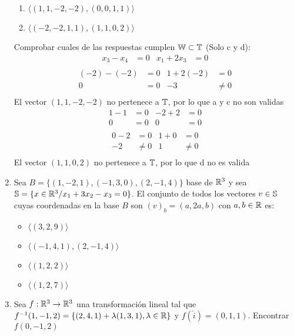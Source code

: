 \documentclass[../practica.root.tex]{subfiles}
\begin{document}
\begin{enumerate}
\begin{enumerate}
              \item \( \langle (1,1,−2,−2),(0,0,1,1) \rangle \) \xmark
              \item \( \langle (−2,−2,1,1),(1,1,0,2) \rangle \) \xmark
          \end{enumerate}
          Comprobar cuales de las respuestas cumplen \( \W \subset \T \) (Solo c y d):
          \begin{align*}
              x_3 − x_4 & = 0 & x_1 + 2x_3 & = 0 \\
          \end{align*}
          \begin{align*}
              (-2) − (-2) & = 0 & 1 + 2(-2) & = 0    \\
              0           & = 0 & -3        & \neq 0 \\
          \end{align*}
          El vector \( (1,1,-2,-2) \) no pertenece a \( \T \), por lo que a y c no son validas
          \begin{align*}
              1 - 1 & = 0 & -2 + 2 & = 0 \\
              0     & = 0 & 0      & = 0 \\
          \end{align*}
          \begin{align*}
              0 - 2 & = 0    & 1 + 0 & = 0    \\
              -2    & \neq 0 & 1     & \neq 0 \\
          \end{align*}
          El vector \( (1,1,0,2) \) no pertenece a \( \T \), por lo que d no es valida
    \item Sea \( B = \{(1,-2,1),(-1,3,0),(2,-1,4) \}\) base de \( \R^3 \) y sea \( \S = \{ x \in \R^3 / x_1 + 3x_2 - x_3 = 0 \} \). El conjunto de todos los vectores \( v \in \S \) cuyas coordenadas en la base \(B\) son \( (v)_b = (a,2a,b) \) con \( a,b \in \R \) es:
          \begin{itemize}
              \item \(\langle (3,2,9) \rangle\)
              \item \(\langle (-1,4,1),(2,-1,4) \rangle\)
              \item \(\langle (1,2,2) \rangle\)
              \item \(\langle (1,2,7) \rangle\)
          \end{itemize}
    \item Sea \( f : \R^3 \to \R^3 \) una transformación lineal tal que \( f^{-1}(1,-1,2) = \{ (2,4,1) + \lambda(1,3,1),\lambda \in \R \} \) y \( f(\hat{i}) = (0,1,1) \). Encontrar \( f(0,-1,2) \) \\ \\

\end{enumerate}
\end{document}
